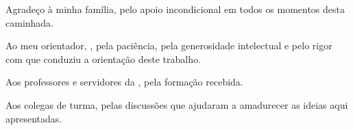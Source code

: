 
\begin{agradecimentos}
Agradeço à minha família, pelo apoio incondicional em todos os momentos desta
caminhada.

Ao meu orientador, \NomeOrientador, pela paciência, pela generosidade
intelectual e pelo rigor com que conduziu a orientação deste trabalho.

Aos professores e servidores da \NomeInstituicao, pela formação recebida.

Aos colegas de turma, pelas discussões que ajudaram a amadurecer as ideias aqui
apresentadas.
\end{agradecimentos}
